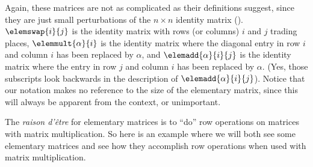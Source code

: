 %
Again, these matrices are not as complicated as their definitions suggest, since they are just small perturbations of the $n\times n$ identity matrix ().  $\elemswap{i}{j}$ is the identity matrix with rows (or columns) $i$ and $j$ trading places, $\elemmult{\alpha}{i}$ is the identity matrix where the diagonal entry in row $i$ and column $i$ has been replaced by $\alpha$, and $\elemadd{\alpha}{i}{j}$ is the identity matrix where the entry in row $j$ and column $i$ has been replaced by $\alpha$. (Yes, those subscripts look backwards in the description of $\elemadd{\alpha}{i}{j}$).  Notice that our notation makes no reference to the size of the elementary matrix, since this will always be apparent from the context, or unimportant.\par
%
The {\it raison d'\^{e}tre} for elementary matrices is to ``do'' row operations on matrices with matrix multiplication.  So here is an example where we will both see some elementary matrices and see how they accomplish row operations when used with matrix multiplication.
%
